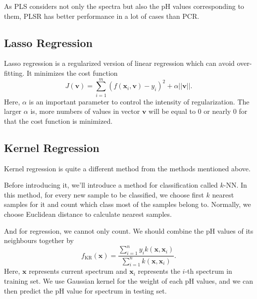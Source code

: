 \documentclass[a4paper]{article}
\newcommand{\bfv}{\mathbf{v}}
\newcommand{\bfx}{\mathbf{x}}
\begin{document}
As PLS considers not only the spectra but also the pH values corresponding to them, PLSR has better performance in a lot of cases than PCR.
\subsection{Lasso Regression}
Lasso regression \cite{tibshirani1996regression} is a regularized version of linear regression which can avoid over-fitting. It minimizes the cost function
\begin{equation}
J(\bfv)=\sum_{i=1}^m (f(\bfx_i,\bfv)-y_i)^2+\alpha ||\bfv||.
\end{equation}
Here, $\alpha$ is an important parameter to control the intensity of regularization. The larger $\alpha$ is, more numbers of values in vector $\bfv$ will be equal to 0 or nearly 0 for that the cost function is minimized.
\subsection{Kernel Regression}
Kernel regression \cite{nadaraya1964estimating} is quite a different method from the methods mentioned above.

Before introducing it, we'll introduce a method for classification called $k$-NN. In this method, for every new sample to be classified, we choose first $k$ nearest samples for it and count which class most of the samples belong to. Normally, we choose Euclidean distance to calculate nearest samples.

And for regression, we cannot only count. We should combine the pH values of its neighbours together by
\begin{equation}
f_{\mathrm{KR}}(\bfx) = \frac{\displaystyle \sum_{i=1}^n y_ik(\bfx,\bfx_i)}{\displaystyle \sum_{i=1}^n k(\bfx,\bfx_i)}.
\end{equation}
Here, $\bfx$ represents current spectrum and $\bfx_i$ represents the $i$-th spectrum in training set. We use Gaussian kernel for the weight of each pH values, and we can then predict the pH value for spectrum in testing set.

 
\end{document}
